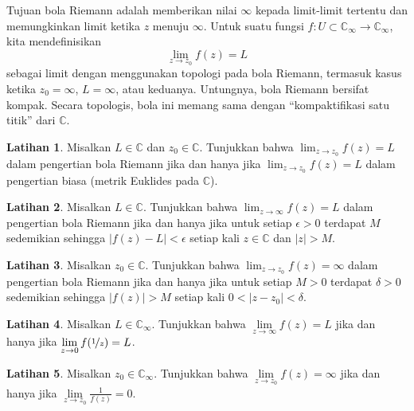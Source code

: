 \documentclass[12pt,openany]{book}
\newcommand{\sabs}[1]{\lvert {#1} \rvert}
\newcommand{\C}{{\mathbb{C}}}
\newcommand{\myquote}[1]{``#1''}
\theoremstyle{plain}
\theoremstyle{remark}
\theoremstyle{definition}
\newenvironment{exbox}{%
    \def\FrameCommand{\vrule width 1pt \relax\hspace{10pt}}%
    \MakeFramed{\advance\hsize-\width\FrameRestore}%
}{%
    \endMakeFramed
}
\theoremstyle{exercise}
\newtheorem{exercise}{Latihan}[section]
\theoremstyle{example}
\begin{document}
Tujuan bola Riemann adalah memberikan nilai $\infty$ kepada limit-limit
tertentu dan memungkinkan limit ketika $z$ menuju $\infty$.  Untuk suatu
fungsi $f \colon U \subset \C_\infty \to \C_\infty$, kita mendefinisikan
\begin{equation*}
\lim_{z \to z_0} f(z) = L
\end{equation*}
sebagai limit dengan menggunakan topologi pada bola Riemann,
termasuk
kasus ketika $z_0 = \infty$, $L = \infty$, atau keduanya.
Untungnya, bola Riemann bersifat kompak.
Secara topologis, bola ini memang sama dengan
\myquote{kompaktifikasi satu titik} dari $\C$.

\begin{exbox}
\begin{exercise}%
Misalkan $L \in \C$ dan $z_0 \in \C$.
Tunjukkan bahwa $\lim_{z\to z_0} f(z) = L$ dalam pengertian bola Riemann
jika dan hanya jika $\lim_{z \to z_0} f(z) = L$ dalam pengertian biasa (metrik Euklides
pada $\C$).
\end{exercise}

\begin{exercise}%
Misalkan $L \in \C$.
Tunjukkan bahwa $\lim_{z\to \infty} f(z) = L$ dalam pengertian bola Riemann
jika dan hanya jika untuk setiap $\epsilon > 0$ terdapat $M$ sedemikian sehingga
$\sabs{f(z)-L} < \epsilon$ setiap kali $z \in \C$ dan $\sabs{z} > M$.
\end{exercise}

\begin{exercise}%
Misalkan $z_0 \in \C$.
Tunjukkan bahwa $\lim_{z\to z_0} f(z) = \infty$ dalam pengertian bola Riemann
jika dan hanya jika untuk setiap $M > 0$ terdapat $\delta > 0$ sedemikian sehingga
$\sabs{f(z)} > M$ setiap kali $0 < \sabs{z-z_0} < \delta$.
\end{exercise}

\begin{exercise}%
Misalkan $L \in \C_\infty$.
Tunjukkan bahwa $\lim\limits_{z\to\infty} f(z) = L$ jika dan hanya jika
$\lim\limits_{z \to 0} f(\nicefrac{1}{z}) = L$.
\end{exercise}

\begin{exercise}%
Misalkan $z_0 \in \C_\infty$.
Tunjukkan bahwa $\lim\limits_{z\to z_0} f(z) = \infty$ jika dan hanya jika
$\lim\limits_{z \to z_0} \frac{1}{f(z)} = 0$.
\end{exercise}
\end{exbox}
\end{document}
